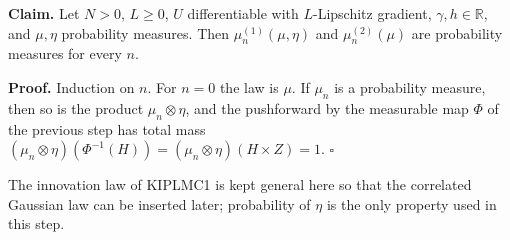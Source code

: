 \documentclass[11pt,a4paper]{report}
\begin{document}
\textbf{Claim.} Let \(N>0\), \(L\ge0\), \(U\) differentiable with \(L\)-Lipschitz gradient, \(\gamma,h\in\mathbb R\), and \(\mu,\eta\) probability measures. Then \(\mu^{(1)}_n(\mu,\eta)\) and \(\mu^{(2)}_n(\mu)\) are probability measures for every \(n\).




\textbf{Proof.} Induction on \(n\). For \(n=0\) the law is \(\mu\). If \(\mu_n\) is a probability measure, then so is the product \(\mu_n\otimes\eta\), and the pushforward by the measurable map \(\Phi\) of the previous step has total mass \((\mu_n\otimes\eta)(\Phi^{-1}(H))=(\mu_n\otimes\eta)(H\times Z)=1\). \(\square\)




The innovation law of KIPLMC1 is kept general here so that the correlated Gaussian law can be inserted later; probability of \(\eta\) is the only property used in this step.
\end{document}
